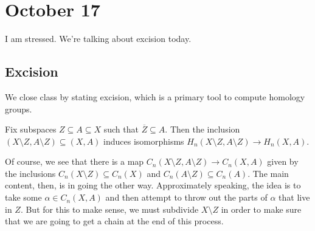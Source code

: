 \documentclass[../notes.tex]{subfiles}
\begin{document}
\section{October 17}

I am stressed. We're talking about excision today.

\subsection{Excision}
We close class by stating excision, which is a primary tool to compute homology groups.
\begin{theorem}[excision]
	Fix subspaces $Z\subseteq A\subseteq X$ such that $\overline Z\subseteq A$. Then the inclusion $(X\setminus Z,A\setminus Z)\subseteq (X,A)$ induces isomorphisms $H_n(X\setminus Z,A\setminus Z)\to H_n(X,A)$.
\end{theorem}
Of course, we see that there is a map $C_n(X\setminus Z,A\setminus Z)\to C_n(X,A)$ given by the inclusions $C_n(X\setminus Z)\subseteq C_n(X)$ and $C_n(A\setminus Z)\subseteq C_n(A)$. The main content, then, is in going the other way. Approximately speaking, the idea is to take some $\alpha\in C_n(X,A)$ and then attempt to throw out the parts of $\alpha$ that live in $Z$. But for this to make sense, we must subdivide $X\setminus Z$ in order to make sure that we are going to get a chain at the end of this process.
\end{document}
